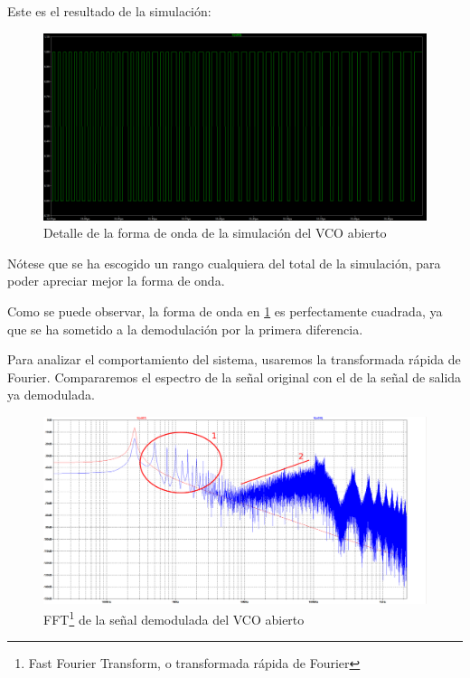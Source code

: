 \documentclass[12pt]{report} %
\begin{document}
	Este es el resultado de la simulación:
	
	\begin{figure}[H]
		\includegraphics[width=\textwidth]{vco-open-first-diff-waveform.png}
		\caption[Detalle de la forma de onda de la simulación del VCO abierto]{Detalle de la forma de onda de la simulación del VCO abierto}
		\label{fig:vco-open-first-diff-waveform.png}
	\end{figure}

	Nótese que se ha escogido un rango cualquiera del total de la simulación, para poder apreciar mejor la forma de onda.
	
	Como se puede observar, la forma de onda en \ref{fig:vco-open-first-diff-waveform.png} es perfectamente cuadrada, ya que se ha sometido a la demodulación por la primera diferencia.
	
	Para analizar el comportamiento del sistema, usaremos la transformada rápida de Fourier. Compararemos el espectro de la señal original con el de la señal de salida ya demodulada.
	
	\begin{figure}[H]
		\includegraphics[width=\textwidth]{vco-open-first-diff-fft-2-annotated.png}
		\caption[FFT de la señal demodulada del VCO abierto]{FFT\footnote{Fast Fourier Transform, o transformada rápida de Fourier} de la señal demodulada del VCO abierto}
		\label{fig:vco-open-first-diff-fft-2.png}
	\end{figure}
\end{document}
